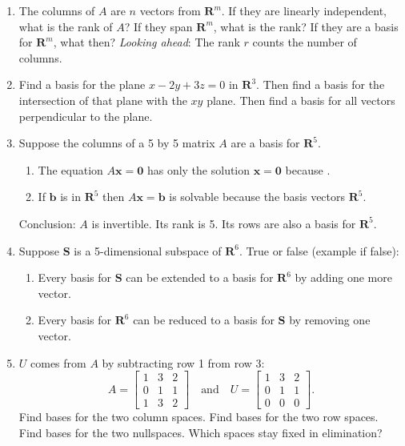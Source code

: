 \documentclass[14pt, a4paper]{article}
\begin{document}
\begin{enumerate}[resume]
    \item The columns of $A$ are $n$ vectors from $\mathbf{R}^m$. If they are linearly independent, what is the rank of $A$? If they span $\mathbf{R}^m$, what is the rank? If they are a basis for $\mathbf{R}^m$, what then? \emph{Looking ahead}: The rank $r$ counts the number of \underline{\hspace{2cm}} columns.

    \item Find a basis for the plane $x - 2y + 3z = 0$ in $\mathbf{R}^3$. Then find a basis for the intersection of that plane with the $xy$ plane. Then find a basis for all vectors perpendicular to the plane.

    \item Suppose the columns of a 5 by 5 matrix $A$ are a basis for $\mathbf{R}^5$.
          \begin{enumerate}
              \item The equation $A\boldsymbol{x} = \boldsymbol{0}$ has only the solution $\boldsymbol{x} = \boldsymbol{0}$ because \underline{\hspace{2cm}}.
              \item If $\boldsymbol{b}$ is in $\mathbf{R}^5$ then $A\boldsymbol{x} = \boldsymbol{b}$ is solvable because the basis vectors \underline{\hspace{2cm}} $\mathbf{R}^5$.
          \end{enumerate}
          Conclusion: $A$ is invertible. Its rank is 5. Its rows are also a basis for $\mathbf{R}^5$.

    \item Suppose $\mathbf{S}$ is a 5-dimensional subspace of $\mathbf{R}^6$. True or false (example if false):
          \begin{enumerate}
              \item Every basis for $\mathbf{S}$ can be extended to a basis for $\mathbf{R}^6$ by adding one more vector.
              \item Every basis for $\mathbf{R}^6$ can be reduced to a basis for $\mathbf{S}$ by removing one vector.
          \end{enumerate}

    \item $U$ comes from $A$ by subtracting row 1 from row 3:
          \[
              A = \begin{bmatrix} 1 & 3 & 2 \\ 0 & 1 & 1 \\ 1 & 3 & 2 \end{bmatrix} \quad \text{and} \quad
              U = \begin{bmatrix} 1 & 3 & 2 \\ 0 & 1 & 1 \\ 0 & 0 & 0 \end{bmatrix}.
          \]
          Find bases for the two column spaces. Find bases for the two row spaces. Find bases for the two nullspaces. Which spaces stay fixed in elimination?


\end{enumerate}
\end{document}
